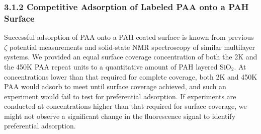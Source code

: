 \documentclass[journal=mamobx,manuscript=article]{achemso}
\begin{document}
\subsubsection{3.1.2 Competitive Adsorption of Labeled PAA onto a PAH Surface}   %
    \label{sec-res-compet}


Successful adsorption of PAA onto a PAH coated surface is known from previous $\zeta$ potential measurements and solid-state NMR spectroscopy of similar multilayer systems.\cite{Burke2003,Smith2004}  We provided an equal surface coverage concentration of both the 2K and the 450K PAA repeat units to a quantitative amount of PAH layered SiO$_2$.  At concentrations lower than that required for complete coverage, both 2K and 450K PAA would adsorb to meet until surface coverage achieved, and such an experiment would fail to test for preferential adsorption.  If experiments are conducted at concentrations higher than that required for surface coverage, we might not observe a significant change in the 
fluorescence signal to identify preferential adsorption. 

\end{document}
